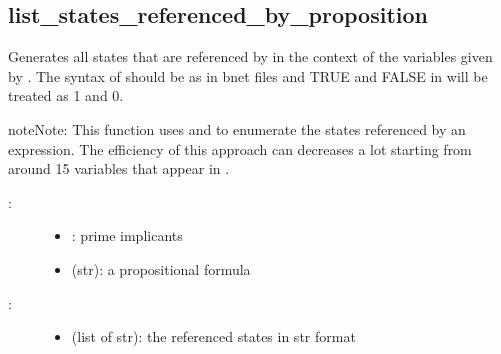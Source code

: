 \documentclass[letterpaper,10pt,english]{sphinxmanual}
\begin{document}
\subsection{list\_states\_referenced\_by\_proposition}
\label{\detokenize{StateTransitionGraphs:list-states-referenced-by-proposition}}\label{\detokenize{StateTransitionGraphs:id16}}

\begin{fulllineitems}
\label{\detokenize{StateTransitionGraphs:PyBoolNet.StateTransitionGraphs.list_states_referenced_by_proposition}}
Generates all states that are referenced by  in the context of the variables given by .
The syntax of  should be as in bnet files and TRUE and FALSE in will be treated as 1 and 0.

\begin{sphinxadmonition}{note}{Note:}
This function uses {\hyperref[\detokenize{FileExchange:bnet2primes}]{}} and {\hyperref[\detokenize{StateTransitionGraphs:list-states-in-subspace}]{}} to enumerate
the states referenced by an expression. The efficiency of this approach can decreases a lot starting from around 15 variables
that appear in .
\end{sphinxadmonition}
\begin{description}
\item[{:}] \leavevmode\begin{itemize}
\item {} 
: prime implicants

\item {} 
 (str): a propositional formula

\end{itemize}

\item[{:}] \leavevmode\begin{itemize}
\item {} 
 (list of str): the referenced states in str format


\end{itemize}
\end{description}
\end{fulllineitems}
\end{document}
